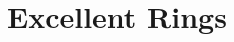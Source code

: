 \documentclass[../main]{subfiles}
\begin{document}
\chapter{Excellent Rings}\label{ch:13}

\setcounter{section}{31}



\end{document}
